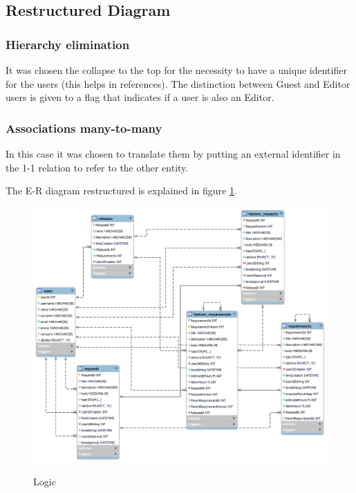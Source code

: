 \documentclass[12pt, a4paper]{report}
\begin{document}
\subsection*{Restructured Diagram}

\subsubsection*{Hierarchy elimination}

It was chosen the collapse to the top for the necessity to have a unique identifier for the users (this helps in references).
The distinction between Guest and Editor users is given to a flag that indicates if a user is also an Editor.

\subsubsection*{Associations many-to-many}

In this case it was chosen to translate them by putting an external identifier in the 1-1 relation to refer to the other
entity.

The E-R diagram restructured is explained in figure \ref{fig:ER_logic}.

\begin{figure}[H]
\centering
\caption{Logic}
\includegraphics[width=\textwidth]{E-R logic}
\label{fig:ER_logic}
\end{figure}
\end{document}
